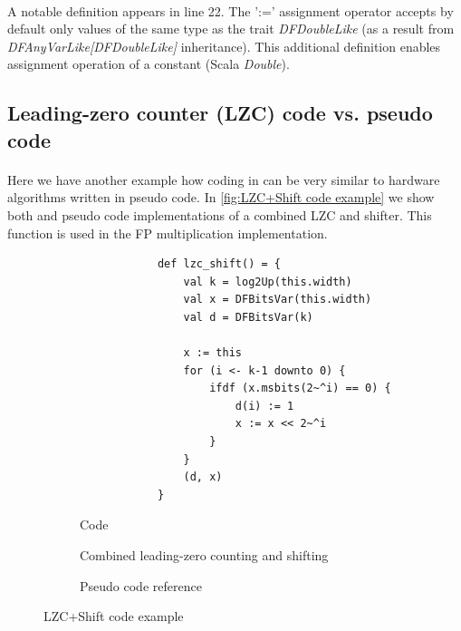 \paragraph{}A notable definition appears in line 22. The ':=' assignment operator accepts by default only values of the same type as the trait \textit{DFDoubleLike} (as a result from \textit{DFAnyVarLike[DFDoubleLike]} inheritance). This additional definition enables assignment operation of a constant (Scala \textit{Double}).

\subsection*{Leading-zero counter (LZC) \cf code vs. pseudo code}
\paragraph{}Here we have another example how coding in \cf can be very similar to hardware algorithms written in pseudo code. In \autoref{fig:LZC+Shift code example} we show both \cf and pseudo \cite{muller2009handbook} code implementations of a combined LZC and shifter. This function is used in the FP multiplication implementation. 
\setalgorithmicfont{\small}
\begin{figure}[h]
	\centering
	\begin{subfigure}[b]{0.49\textwidth}
		\begin{verbatim}
			def lzc_shift() = {
				val k = log2Up(this.width)
				val x = DFBitsVar(this.width)
				val d = DFBitsVar(k)
			
				x := this
				for (i <- k-1 downto 0) {
					ifdf (x.msbits(2~^i) == 0) {
						d(i) := 1
						x := x << 2~^i
					}
				}
				(d, x)
			}
		\end{verbatim}
		\caption{\cf Code}
		\vspace*{2mm}
	\end{subfigure}
	\hfill
	\begin{subfigure}[b]{0.49\textwidth}
		\begin{algorithm}[H]
  		\caption*{Combined leading-zero counting and shifting}
		\begin{algorithmic}
			 
				\ELSE 
				\ENDIF
			\ENDFOR
		\end{algorithmic}
		\end{algorithm}
		\caption{Pseudo code reference}
		\vspace*{2mm}
	\end{subfigure}
	\caption{LZC+Shift code example}\label{fig:LZC+Shift code example}
\end{figure}

